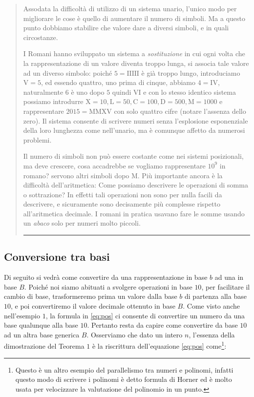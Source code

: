 \documentclass[a4paper]{book}
\theoremstyle{definition}
\newcommand{\nota}[1]{\marginpar[{\raggedleft\small\sffamily #1\\}]{%
 								 {\raggedright\small\sffamily #1\\}}}
\begin{document}
\begin{quote}
Assodata la difficoltà di utilizzo di un sistema unario, l'unico modo per
migliorare le cose è quello di aumentare il numero di simboli. Ma a questo
punto dobbiamo stabilire che valore dare a diversi simboli, e in quali
circostanze.

I Romani\nota{Numerazione Romana} hanno sviluppato un sistema a
\emph{sostituzione} in cui ogni volta che la rappresentazione di un valore
diventa troppo lunga, si associa tale valore ad un diverso simbolo: poiché $5 =
\mathrm{IIIII}$ è già troppo lungo, introduciamo $\mathrm{V} = 5$, ed essendo
quattro, uno prima di cinque, abbiamo $4 = \mathrm{IV}$, naturalmente $6$ è uno
dopo $5$ quindi $\mathrm{VI}$ e con lo stesso identico sistema possiamo
introdurre $\mathrm{X} = 10, \mathrm{L} = 50, \mathrm{C} = 100, \mathrm{D} =
500, \mathrm{M} = 1000$ e rappresentare $2015 = \mathrm{MMXV}$ con solo quattro
cifre (notare l'assenza dello zero). Il sistema consente di scrivere numeri
senza l'esplosione esponenziale della loro lunghezza come nell'unario, ma è
comunque affetto da numerosi problemi.

Il numero di simboli non può essere costante come nei sistemi posizionali, ma
deve crescere, cosa accadrebbe se vogliamo rappresentare $10^9$ in romano?
servono altri simboli dopo $\mathrm{M}$. Più importante ancora è la difficoltà
dell'aritmetica: Come possiamo descrivere le operazioni di somma o sottrazione?
In effetti tali operazioni non sono per nulla facili da descrivere, e
sicuramente sono decisamente più complesse rispetto all'aritmetica decimale. I
romani in pratica usavano fare le somme usando un \emph{abaco} solo per numeri
molto piccoli.\par
{\hfill \rule{0.9\textwidth}{0.5pt} \hfill}

\end{quote}

\subsection{Conversione tra basi}

Di seguito si vedrà come convertire da una rappresentazione in base $b$ ad una
in base $B$. Poiché noi siamo abituati a svolgere operazioni in base $10$, per
facilitare il cambio di base, trasformeremo prima un valore dalla base $b$ di
partenza alla base $10$, e poi convertiremo il valore decimale ottenuto in base
$B$. Come visto anche nell'esempio $1$, la formula in \eqref{eq:pos} ci
consente di convertire un numero da una base qualunque alla base $10$. Pertanto
resta da capire come convertire da base $10$ ad un altra base generica $B$.
Osserviamo che dato un intero $n$, l'essenza della dimostrazione del Teorema $1$ è la riscrittura dell'equazione \eqref{eq:pos}
come\footnote{Questo è un altro esempio del parallelismo tra numeri e polinomi, infatti questo modo di scrivere i polinomi è detto formula di Horner ed è molto usata per velocizzare la valutazione del polinomio in un punto.}:
\end{document}
